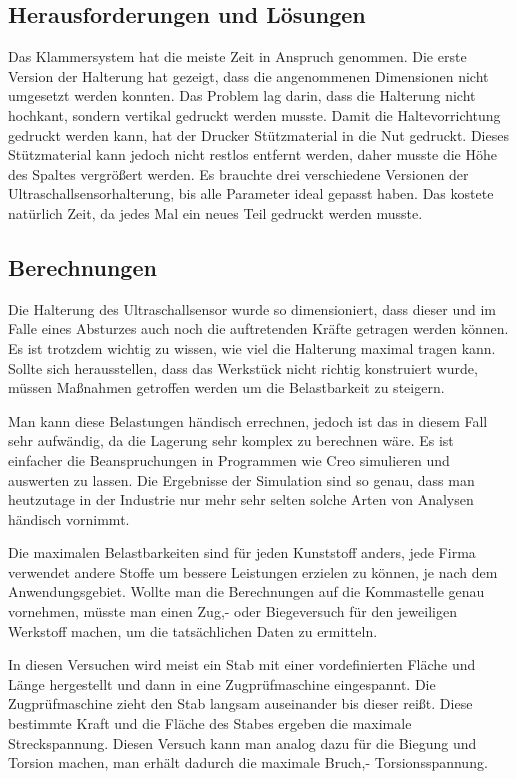 	\subsection{Herausforderungen und Lösungen}

	Das Klammersystem hat die meiste Zeit in Anspruch genommen.
	Die erste Version der Halterung hat gezeigt, dass die angenommenen Dimensionen nicht umgesetzt werden konnten.
	Das Problem lag darin, dass die Halterung nicht hochkant, sondern vertikal gedruckt werden musste.
	Damit die Haltevorrichtung gedruckt werden kann, hat der Drucker Stützmaterial in die Nut gedruckt.
	Dieses Stützmaterial kann jedoch nicht restlos entfernt werden, daher musste die Höhe des Spaltes vergrößert werden.
	Es brauchte drei verschiedene Versionen der Ultraschallsensorhalterung, bis alle Parameter ideal gepasst haben. Das kostete natürlich Zeit, da jedes Mal ein neues Teil gedruckt werden musste.

			\newpage

	\subsection{Berechnungen}

	Die Halterung des Ultraschallsensor wurde so dimensioniert, dass dieser und im Falle eines Absturzes auch noch die auftretenden Kräfte getragen werden können.
	Es ist trotzdem wichtig zu wissen, wie viel die Halterung maximal tragen kann.
	Sollte sich herausstellen, dass das Werkstück nicht richtig konstruiert wurde, müssen Maßnahmen getroffen werden um die Belastbarkeit zu steigern.

	Man kann diese Belastungen händisch errechnen, jedoch ist das in diesem Fall sehr aufwändig, da die Lagerung sehr komplex zu berechnen wäre.
	Es ist einfacher die Beanspruchungen in Programmen wie Creo simulieren und auswerten zu lassen.
	Die Ergebnisse der Simulation sind so genau, dass man heutzutage in der Industrie nur mehr sehr selten solche Arten von Analysen händisch vornimmt.

	Die maximalen Belastbarkeiten sind für jeden Kunststoff anders, jede Firma verwendet andere Stoffe um bessere Leistungen erzielen zu können, je nach dem Anwendungsgebiet.
	Wollte man die Berechnungen auf die Kommastelle genau vornehmen, müsste man einen Zug,- oder Biegeversuch für den jeweiligen Werkstoff machen,
	um die tatsächlichen Daten zu ermitteln.

	In diesen Versuchen wird meist ein Stab mit einer vordefinierten Fläche und Länge hergestellt und dann in eine Zugprüfmaschine eingespannt.
	Die Zugprüfmaschine zieht den Stab langsam auseinander bis dieser reißt. Diese bestimmte Kraft und die Fläche des Stabes ergeben die maximale Streckspannung.
	Diesen Versuch kann man analog dazu für die Biegung und Torsion machen, man erhält dadurch die maximale Bruch,- \bzw Torsionsspannung.

